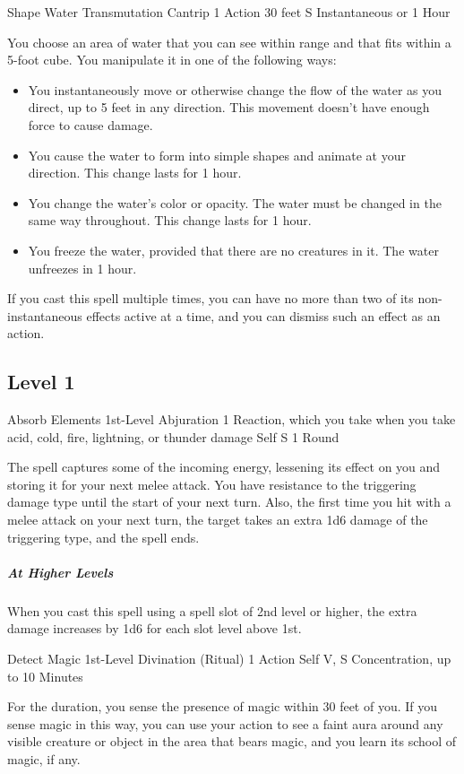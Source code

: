 {\DndSpellHeader
  {Shape Water}
  {Transmutation Cantrip}
  {1 Action}
  {30 feet}
  {S}
  {Instantaneous or 1 Hour}

You choose an area of water that you can see within range and that fits within a 5-foot cube. You manipulate it in one of the following ways:

\begin{itemize}
	\item You instantaneously move or otherwise change the flow of the water as you direct, up to 5 feet in any direction. This movement doesn’t have enough force to cause damage.
	\item You cause the water to form into simple shapes and animate at your direction. This change lasts for 1 hour.
	\item You change the water’s color or opacity. The water must be changed in the same way throughout. This change lasts for 1 hour.
	\item You freeze the water, provided that there are no creatures in it. The water unfreezes in 1 hour.
\end{itemize}
If you cast this spell multiple times, you can have no more than two of its non-instantaneous effects active at a time, and you can dismiss such an effect as an action.

\subsection*{Level 1}

\DndSpellHeader
  {Absorb Elements}
  {1st-Level Abjuration}
  {1 Reaction, which you take when you take acid, cold, fire, lightning, or thunder damage}
  {Self}
  {S}
  {1 Round}

The spell captures some of the incoming energy, lessening its effect on you and storing it for your next melee attack. You have resistance to the triggering damage type until the start of your next turn. Also, the first time you hit with a melee attack on your next turn, the target takes an extra 1d6 damage of the triggering type, and the spell ends.

\subparagraph*{At Higher Levels} When you cast this spell using a spell slot of 2nd level or higher, the extra damage increases by 1d6 for each slot level above 1st.

\DndSpellHeader
  {Detect Magic}
  {1st-Level Divination (Ritual)}
  {1 Action}
  {Self}
  {V, S}
  {Concentration, up to 10 Minutes}

For the duration, you sense the presence of magic within 30 feet of you. If you sense magic in this way, you can use your action to see a faint aura around any visible creature or object in the area that bears magic, and you learn its school of magic, if any.

}
